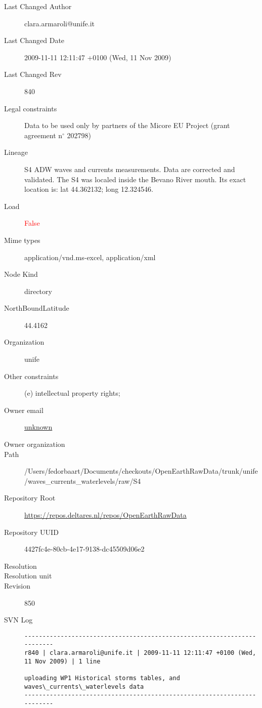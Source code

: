 \documentclass[9]{report}
\begin{document}
\begin{description}
  \item[Last Changed Author] clara.armaroli@unife.it
  \item[Last Changed Date] 2009-11-11 12:11:47 +0100 (Wed, 11 Nov 2009)
  \item[Last Changed Rev] 840
  \item[Legal constraints] Data to be used only by partners of the Micore EU Project (grant agreement n\mbox{$^\circ$} 202798)
  \item[Lineage] S4 ADW waves and currents measurements. Data are corrected and validated. The S4 was localed inside the Bevano River mouth. Its exact location is: lat 44.362132; long 12.324546.
  \item[Load] \textcolor{red}{False}
  \item[Mime types] application/vnd.ms-excel, application/xml
  \item[Node Kind] directory
  \item[NorthBoundLatitude] 44.4162
  \item[Organization] unife
  \item[Other constraints] (e) intellectual property rights;
  \item[Owner email] \href{mailto:unknown}{unknown}
  \item[Owner organization] 
  \item[Path] /Users/fedorbaart/Documents/checkouts/OpenEarthRawData/trunk/unife/waves\_currents\_waterlevels/raw/S4
  \item[Repository Root] \href{https://repos.deltares.nl/repos/OpenEarthRawData}{https://repos.deltares.nl/repos/OpenEarthRawData}
  \item[Repository UUID] 4427fc4e-80cb-4e17-9138-dc45509d06e2
  \item[Resolution] 
  \item[Resolution unit] 
  \item[Revision] 850
  \item[SVN Log] \begin{verbatim}
------------------------------------------------------------------------
r840 | clara.armaroli@unife.it | 2009-11-11 12:11:47 +0100 (Wed, 11 Nov 2009) | 1 line

uploading WP1 Historical storms tables, and waves\_currents\_waterlevels data
------------------------------------------------------------------------


\end{verbatim}
\end{description}
\end{document}
